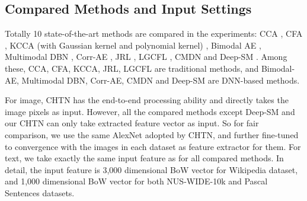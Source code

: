 \documentclass{article}
\begin{document}
\subsection{Compared Methods and Input Settings}

Totally 10 state-of-the-art methods are compared in the experiments: CCA \cite{HotelingBiometrika36RelationBetweenTwoVariates}, CFA \cite{LiMM03CFA}, KCCA (with Gaussian kernel and polynomial kernel) \cite{DBLP:journals/neco/HardoonSS04}, Bimodal AE \cite{ngiam32011multimodal}, Multimodal DBN \cite{srivastava2012learning}, Corr-AE \cite{feng12014cross}, JRL \cite{ZhaiTCSVT2014JRL}, LGCFL \cite{DBLP:journals/tmm/KangXLXP15}, CMDN \cite{DBLP:conf/ijcai/PengHQ16} and Deep-SM \cite{DBLP:journals/tcyb/WeiZLWLZY17}. Among these, CCA, CFA, KCCA, JRL, LGCFL are traditional methods, and Bimodal-AE, Multimodal DBN, Corr-AE, CMDN and Deep-SM are DNN-based methods.

For image, CHTN has the end-to-end processing ability and directly takes the image pixels as input. However, all the compared methods except Deep-SM and our CHTN can only take extracted feature vector as input. So for fair comparison, we use the same AlexNet adopted by CHTN, and further fine-tuned to convergence with the images in each dataset as feature extractor for them. 
For text, we take exactly the same input feature as \cite{feng12014cross,DBLP:conf/ijcai/PengHQ16} for all compared methods. In detail, the input feature is 3,000 dimensional BoW vector for Wikipedia dataset, and 1,000 dimensional BoW vector for both NUS-WIDE-10k and Pascal Sentences datasets.




\end{document}

